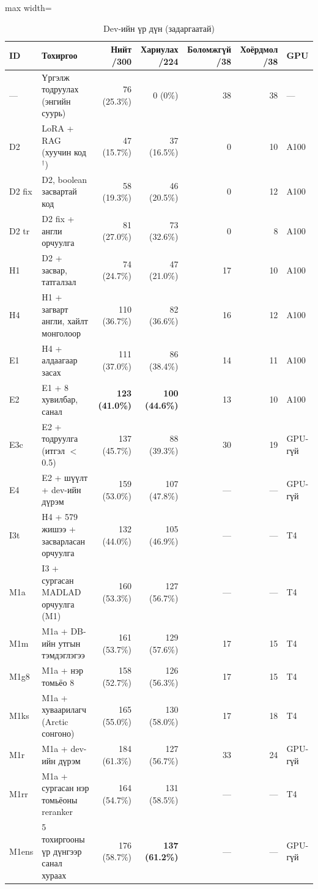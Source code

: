 \begin{table}[H]
\centering\small
\caption{Dev-ийн үр дүн (задаргаатай)}
\label{tab:dev-full}
\begin{adjustbox}{max width=\textwidth}
\begin{tabular}{llrrrrl}
\toprule
ID & Тохиргоо & Нийт /300 & Хариулах /224 & Боломжгүй /38 & Хоёрдмол /38 & GPU \\
\midrule
--- & Үргэлж тодруулах (энгийн суурь) & 76 (25.3\%) & 0 (0\%) & 38 & 38 & --- \\
\midrule
D2 & LoRA + RAG (хуучин код$^\dagger$) & 47 (15.7\%) & 37 (16.5\%) & 0 & 10 & A100 \\
D2 fix & D2, boolean засвартай код & 58 (19.3\%) & 46 (20.5\%) & 0 & 12 & A100 \\
D2 tr & D2 fix + англи орчуулга & 81 (27.0\%) & 73 (32.6\%) & 0 & 8 & A100 \\
H1 & D2 + засвар, татгалзал & 74 (24.7\%) & 47 (21.0\%) & 17 & 10 & A100 \\
H4 & H1 + загварт англи, хайлт монголоор & 110 (36.7\%) & 82 (36.6\%) & 16 & 12 & A100 \\
E1 & H4 + алдаагаар засах & 111 (37.0\%) & 86 (38.4\%) & 14 & 11 & A100 \\
E2 & E1 + 8 хувилбар, санал & \textbf{123 (41.0\%)} & \textbf{100 (44.6\%)} & 13 & 10 & A100 \\
E3c & E2 + тодруулга (итгэл $<$ 0.5) & 137 (45.7\%) & 88 (39.3\%) & 30 & 19 & GPU-гүй \\
E4 & E2 + шүүлт + dev-ийн дүрэм & 159 (53.0\%) & 107 (47.8\%) & --- & --- & GPU-гүй \\
I3t & H4 + 579 жишээ + засварласан орчуулга & 132 (44.0\%) & 105 (46.9\%) & --- & --- & T4 \\
M1a & I3 + сургасан MADLAD орчуулга (M1) & 160 (53.3\%) & 127 (56.7\%) & --- & --- & T4 \\
M1m & M1a + DB-ийн утгын тэмдэглэгээ & 161 (53.7\%) & 129 (57.6\%) & 17 & 15 & T4 \\
M1g8 & M1a + нэр томьёо 8 & 158 (52.7\%) & 126 (56.3\%) & 17 & 15 & T4 \\
M1ks & M1a + хуваарилагч (Arctic сонгоно) & 165 (55.0\%) & 130 (58.0\%) & 17 & 18 & T4 \\
M1r & M1a + dev-ийн дүрэм & 184 (61.3\%) & 127 (56.7\%) & 33 & 24 & GPU-гүй \\
M1rr & M1a + сургасан нэр томьёоны reranker & 164 (54.7\%) & 131 (58.5\%) & --- & --- & T4 \\
M1ens & 5 тохиргооны үр дүнгээр санал хураах & 176 (58.7\%) & \textbf{137 (61.2\%)} & --- & --- & GPU-гүй \\

\end{tabular}
\end{adjustbox}
\end{table}

